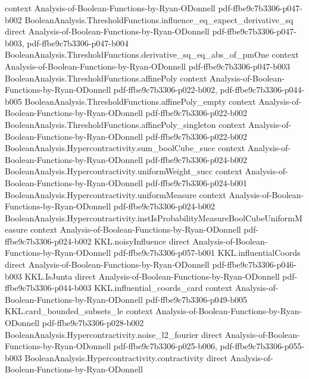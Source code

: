 \begin{theorem}
  {context}
  {Analysis-of-Boolean-Functions-by-Ryan-ODonnell}
  {pdf-ffbe9c7b3306-p047-b002}
\proofstep
  {BooleanAnalysis.ThresholdFunctions.influence_eq_expect_derivative_sq}
  {direct}
  {Analysis-of-Boolean-Functions-by-Ryan-ODonnell}
  {pdf-ffbe9c7b3306-p047-b003,
    pdf-ffbe9c7b3306-p047-b004}
\proofstep
  {BooleanAnalysis.ThresholdFunctions.derivative_sq_eq_abs_of_pmOne}
  {context}
  {Analysis-of-Boolean-Functions-by-Ryan-ODonnell}
  {pdf-ffbe9c7b3306-p047-b003}
\proofstep
  {BooleanAnalysis.ThresholdFunctions.affinePoly}
  {context}
  {Analysis-of-Boolean-Functions-by-Ryan-ODonnell}
  {pdf-ffbe9c7b3306-p022-b002,
    pdf-ffbe9c7b3306-p044-b005}
\proofstep
  {BooleanAnalysis.ThresholdFunctions.affinePoly_empty}
  {context}
  {Analysis-of-Boolean-Functions-by-Ryan-ODonnell}
  {pdf-ffbe9c7b3306-p022-b002}
\proofstep
  {BooleanAnalysis.ThresholdFunctions.affinePoly_singleton}
  {context}
  {Analysis-of-Boolean-Functions-by-Ryan-ODonnell}
  {pdf-ffbe9c7b3306-p022-b002}
\proofstep
  {BooleanAnalysis.Hypercontractivity.sum_boolCube_succ}
  {context}
  {Analysis-of-Boolean-Functions-by-Ryan-ODonnell}
  {pdf-ffbe9c7b3306-p024-b002}
\proofstep
  {BooleanAnalysis.Hypercontractivity.uniformWeight_succ}
  {context}
  {Analysis-of-Boolean-Functions-by-Ryan-ODonnell}
  {pdf-ffbe9c7b3306-p024-b001}
\proofstep
  {BooleanAnalysis.Hypercontractivity.uniformMeasure}
  {context}
  {Analysis-of-Boolean-Functions-by-Ryan-ODonnell}
  {pdf-ffbe9c7b3306-p024-b002}
\proofstep
  {BooleanAnalysis.Hypercontractivity.instIsProbabilityMeasureBoolCubeUniformMeasure}
  {context}
  {Analysis-of-Boolean-Functions-by-Ryan-ODonnell}
  {pdf-ffbe9c7b3306-p024-b002}
\proofstep
  {KKL.noisyInfluence}
  {direct}
  {Analysis-of-Boolean-Functions-by-Ryan-ODonnell}
  {pdf-ffbe9c7b3306-p057-b001}
\proofstep
  {KKL.influentialCoords}
  {direct}
  {Analysis-of-Boolean-Functions-by-Ryan-ODonnell}
  {pdf-ffbe9c7b3306-p046-b003}
\proofstep
  {KKL.IsJunta}
  {direct}
  {Analysis-of-Boolean-Functions-by-Ryan-ODonnell}
  {pdf-ffbe9c7b3306-p044-b003}
\proofstep
  {KKL.influential_coords_card}
  {context}
  {Analysis-of-Boolean-Functions-by-Ryan-ODonnell}
  {pdf-ffbe9c7b3306-p049-b005}
\proofstep
  {KKL.card_bounded_subsets_le}
  {context}
  {Analysis-of-Boolean-Functions-by-Ryan-ODonnell}
  {pdf-ffbe9c7b3306-p028-b002}
\proofstep
  {BooleanAnalysis.Hypercontractivity.noise_l2_fourier}
  {direct}
  {Analysis-of-Boolean-Functions-by-Ryan-ODonnell}
  {pdf-ffbe9c7b3306-p025-b006,
    pdf-ffbe9c7b3306-p055-b003}
\proofstep
  {BooleanAnalysis.Hypercontractivity.contractivity}
  {direct}
  {Analysis-of-Boolean-Functions-by-Ryan-ODonnell}

\end{theorem}
